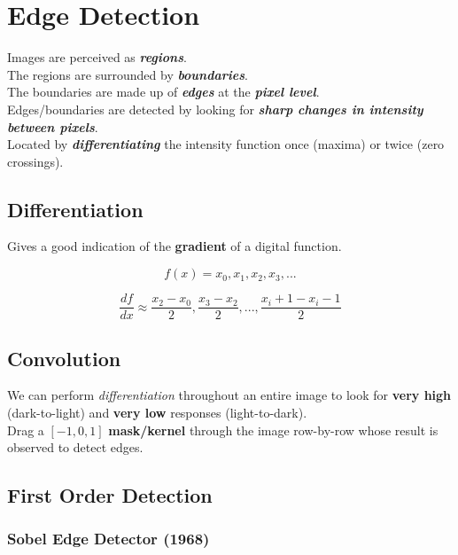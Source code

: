\documentclass[english, 10pt]{article}
\begin{document}
\section{Edge Detection}\label{edge-detection}

  Images are perceived as \emph{\textbf{regions}}. \\

  The regions are surrounded by \emph{\textbf{boundaries}}. \\

  The boundaries are made up of \emph{\textbf{edges}} at the \textbf{\emph{pixel
  level}}. \\

  Edges/boundaries are detected by looking for \textbf{\emph{sharp
  changes in \emph{intensity} between pixels}}. \\
  
   Located by \textbf{\textit{differentiating}} the intensity function once (maxima) or twice (zero crossings).
  
  \subsection{Differentiation}
  
  Gives a good indication of the \textbf{gradient} of a digital function.
  
  $$ f(x) = x_0, x_1, x_2, x_3, ...$$
  
  $$ \frac{df}{dx} \approx \frac{x_2 - x_0}{2}, \frac{x_3 - x_2}{2}, ..., \frac{x_i+1 - x_i-1}{2}$$
  

\subsection{Convolution}\label{convolution}

  We can perform \textit{differentiation} throughout an entire image to look
  for \textbf{very high} (dark-to-light) and \textbf{very low} responses (light-to-dark).\\

  Drag a $[-1,0,1]$ \textbf{mask/kernel} through the image row-by-row whose result is observed to detect edges.

\subsection{First Order Detection}\label{tools}

\subsubsection{Sobel Edge Detector
(1968)}\label{sobel-edge-detector-1968}
\end{document}
